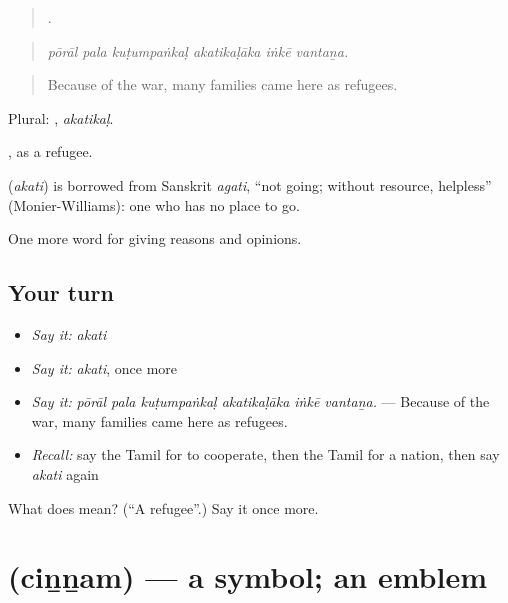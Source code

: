 \begin{quote}
     .
\end{quote}

\begin{quote}
\emph{pōrāl pala kuṭumpaṅkaḷ akatikaḷāka iṅkē vantaṉa.}
\end{quote}

\begin{quote}
Because of the war, many families came here as refugees.
\end{quote}

Plural: , \emph{akatikaḷ}.

, as a refugee.

\begin{cousinweb}
\textbf{} (\emph{akati}) is borrowed from Sanskrit \emph{agati}, \textquotedblleft{}not going; without resource, helpless\textquotedblright{} (Monier-Williams): one who has no place to go.
\end{cousinweb}

\begin{grammarlens}[title={What you've built}]
One more word for giving reasons and opinions.
\end{grammarlens}

\subsection*{Your turn}
\begin{itemize}
\raggedright
  \item \emph{Say it:} \emph{akati}
  \item \emph{Say it:} \emph{akati}, once more
  \item \emph{Say it:} \emph{pōrāl pala kuṭumpaṅkaḷ akatikaḷāka iṅkē vantaṉa.} — Because of the war, many families came here as refugees.
  \item \emph{Recall:} say the Tamil for to cooperate, then the Tamil for a nation, then say \emph{akati} again
\end{itemize}

\begin{tcolorbox}[breakable,colback=teal!4,colframe=teal!35!black,title={Before you move on}]
What does  mean? (\textquotedblleft{}A refugee\textquotedblright{}.) Say it once more.
\end{tcolorbox}
\section[\texorpdfstring{\ta{சின்னம்} (ciṉṉam)}{சின்னம் (ciṉṉam)}]{ (ciṉṉam) — a symbol; an emblem}


